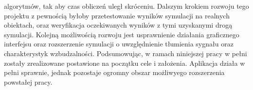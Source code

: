 algorytmów, tak aby czas obliczeń uległ skróceniu. Dalszym krokiem rozwoju tego projektu z pewnością byłoby przetestowanie wyników symulacji na realnych obiektach, oraz weryfikacja oczekiwanych wyników z tymi uzyskanymi drogą symulacji. Kolejną możliwością rozwoju jest usprawnienie działania graficznego interfejsu oraz rozszerzenie symulacji o uwzględnienie tłumienia sygnału oraz charakterystyk wzbudzalności. Podsumowując, w ramach niniejszej pracy w pełni zostały zrealizowane postawione na początku cele i założenia. Aplikacja działa w pełni sprawnie, jednak pozostaje ogromny obszar możliwyego rozszerzenia powstałej pracy. 